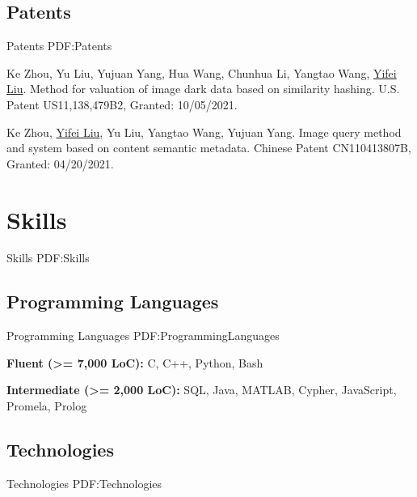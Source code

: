 \documentclass[a4paper,10pt,oneside]{article}
\begin{document}
\begin{body}


\subsection
{Patents}
{Patents}
{PDF:Patents}

\NumberedItem{[1]}
Ke Zhou, Yu Liu, Yujuan Yang, Hua Wang, Chunhua Li, Yangtao Wang, \underline{Yifei Liu}. Method for valuation of image dark data based on similarity hashing. U.S. Patent US11,138,479B2, Granted: 10/05/2021. %

\Gap

\NumberedItem{[2]}
Ke Zhou, \underline{Yifei Liu}, Yu Liu, Yangtao Wang, Yujuan Yang. Image query method and system based on content semantic metadata. Chinese Patent CN110413807B, Granted: 04/20/2021. %


\section
{Skills}
{Skills}
{PDF:Skills}

\subsection
{Programming Languages}
{Programming Languages}
{PDF:ProgrammingLanguages}

\BulletItem
\textbf{Fluent (>= 7,000 LoC):} C, C++, Python, Bash

\GapNoBreak

\BulletItem
\textbf{Intermediate (>= 2,000 LoC):} SQL, Java, MATLAB, Cypher, JavaScript, Promela, Prolog



\subsection
{Technologies}
{Technologies}
{PDF:Technologies}


\end{body}
\end{document}
